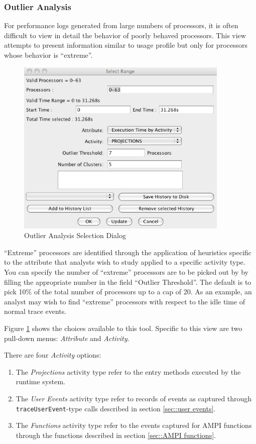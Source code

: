 \subsubsection{Outlier Analysis}
\label{sec::outlier}

For performance logs generated from large numbers of processors, it is
often difficult to view in detail the behavior of poorly behaved
processors. This view attempts to present information similar to usage
profile but only for processors whose behavior is ``extreme''.

\begin{figure}[htb]
\center
\includegraphics[width=4.0in]{fig/outlier_dialog}
\caption{Outlier Analysis Selection Dialog}
\label{outlier dialog}
\end{figure}

``Extreme'' processors are identified through the application of
heuristics specific to the attribute that analysts wish to study
applied to a specific activity type. You can specify the number of
``extreme'' processors are to be picked out by \projections{} by
filling the appropriate number in the field ``Outlier Threshold''. The
default is to pick 10\% of the total number of processors up to a cap
of 20. As an example, an analyst may wish to find ``extreme''
processors with respect to the idle time of normal \charmpp{} trace
events.

Figure \ref{outlier dialog} shows the choices available to this
tool. Specific to this view are two pull-down menus: {\em Attribute}
and {\em Activity}.

There are four {\em Activity} options:
\begin{enumerate}
\item The {\em Projections} activity type refer to the entry methods 
executed by the \charmpp{} runtime system.
\item The {\em User Events} activity type refer to records of events
as captured through {\tt traceUserEvent}-type calls described in
section \ref{sec::user events}.
\item The {\em Functions} activity type refer to the events captured
for AMPI functions through the functions described in section
\ref{sec::AMPI functions}.
\end{enumerate}

